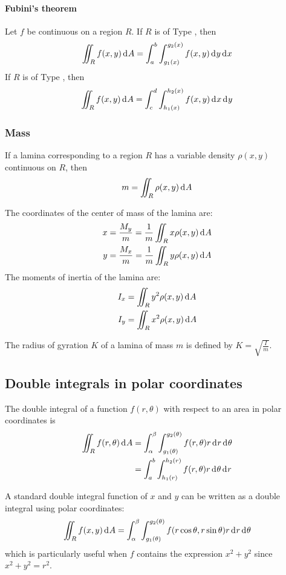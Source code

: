 \documentclass[10pt, twocolumn]{article}
\theoremstyle{remark}
\begin{document}
\paragraph*{Fubini's theorem}
Let \(f\) be continuous on a region \(R\).
If \(R\) is of Type , then
\[
  \iint_R {f(x, y) \,\mathrm{d}^{} A} = \int_a ^b {\int_{g_1 (x)}^{g_2 (x)}{f(x, y) \,\mathrm{d}^{} y}\,\mathrm{d}^{} x}
\]
If \(R\) is of Type , then
\[
  \iint_R {f(x, y) \,\mathrm{d}^{} A} = \int_c ^d {\int_{h_1 (x)}^{h_2 (x)}{f(x, y) \,\mathrm{d}^{} x}\,\mathrm{d}^{} y}
\]

\subsubsection*{Mass}
If a lamina corresponding to a region \(R\) has a variable density \(\rho(x, y)\) continuous on \(R\), then
\[
  m = \iint_R {\rho(x, y) \,\mathrm{d}^{} A}
\]

The coordinates of the center of mass of the lamina are:
\begin{align*}
  x & = \frac{M_y }{m} = \frac{1}{m} \iint_R {x\rho(x, y) \,\mathrm{d}^{} A} \\
  y & = \frac{M_x }{m} = \frac{1}{m} \iint_R {y\rho(x, y) \,\mathrm{d}^{} A}
\end{align*}
The moments of inertia of the lamina are:
\begin{align*}
  I_x & = \iint_R {y^2 \rho(x, y) \,\mathrm{d}^{} A} \\
  I_y & = \iint_R {x^2 \rho(x, y) \,\mathrm{d}^{} A}
\end{align*}

The radius of gyration \(K\) of a lamina of mass \(m\) is defined by \(K = \sqrt{\frac{I}{m}}\).

\subsection{Double integrals in polar coordinates}
The double integral of a function \(f(r, \theta)\) with respect to an area in polar coordinates is
\begin{align*}
  \iint_R {f(r, \theta) \,\mathrm{d}^{} A} & = \int_{\alpha}^{\beta}{\int_{g_1 (\theta)}^{g_2 (\theta)}{f(r, \theta)r \,\mathrm{d}^{} r}\,\mathrm{d}^{} \theta} \\
                                     & = \int_a ^b {\int_{h_1 (r)}^{h_2 (r)}{f(r, \theta)r \,\mathrm{d}^{} \theta}\,\mathrm{d}^{} r}
\end{align*}

A standard double integral function of \(x\) and \(y\) can be written as a double integral using polar coordinates:
\[
  \iint_R {f(x, y) \,\mathrm{d}^{} A} = \int_{\alpha}^{\beta}{\int_{g_1 (\theta)}^{g_2 (\theta)}{f(r\cos\theta, r\sin\theta)r \,\mathrm{d}^{} r}\,\mathrm{d}^{} \theta}
\]
which is particularly useful when \(f\) contains the expression \(x^2 + y^2 \) since \(x^2 + y^2 = r^2 \).
\end{document}
